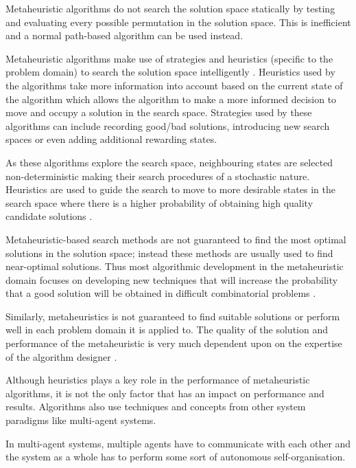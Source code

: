Metaheuristic algorithms do not search the solution space statically by testing and evaluating every possible permutation in the solution space. This is inefficient and a normal path-based algorithm can be used instead\cite{MetaAgricultural}.

Metaheuristic algorithms make use of strategies and heuristics (specific to the problem domain) to search the solution space intelligently \cite{MetaAgricultural}. Heuristics used by the algorithms take more information into account based on the current state of the algorithm which allows the algorithm to make a more informed decision to move and occupy a solution in the search space\cite{AIModernApproach}. Strategies used by these algorithms can include recording good/bad solutions, introducing new search spaces or even adding additional rewarding states\cite{NatureInspiredMetaHeuristic,AIModernApproach,CompuIntelligenceIntro}. 

As these algorithms explore the search space, neighbouring states are selected non-deterministic making their search procedures of a stochastic nature\cite{HandbookofMH, NatureInspiredMetaHeuristic}. Heuristics are used to guide the search to move to more desirable states in the search space where there is a higher probability of obtaining high quality candidate solutions \cite{TabuMontemanniSmith,SweepMeta}.

Metaheuristic-based search methods are not guaranteed to find the most optimal solutions in the solution space; instead these methods are usually used to find near-optimal solutions. Thus most algorithmic development in the metaheuristic domain focuses on developing new techniques that will increase the probability that a good solution will be obtained in difficult combinatorial problems \cite{MetaAgricultural}.

Similarly, metaheuristics is not guaranteed to find suitable solutions or perform well in each problem domain it is applied to. The quality of the solution and performance of the metaheuristic is very much dependent upon on the expertise of the algorithm designer \cite{AutoComplexMeta}. 

Although heuristics plays a key role in the performance of metaheuristic algorithms, it is not the only factor that has an impact on performance and results. Algorithms also use techniques and concepts from other system paradigms like multi-agent systems\cite{Self-AdaptiveMeta}. 

In multi-agent systems, multiple agents have to communicate with each other and the system as a whole has to perform some sort of autonomous self-organisation\cite{Self-AdaptiveMeta}.

